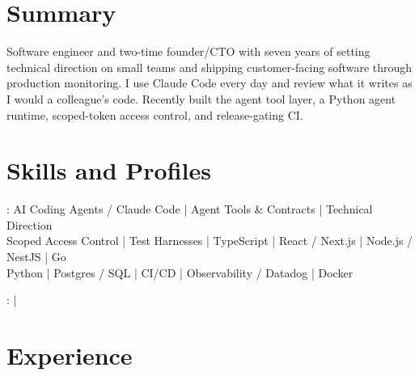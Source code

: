 \documentclass[print]{jack-resume}
\begin{document}
\pagecolor{darkmodeBackground}


\begin{minipage}[t][1cm][t]{.03\textwidth}
    \hfill
\end{minipage}

\section{Summary}
Software engineer and two-time founder/CTO with seven years of setting technical direction on small teams and shipping customer-facing software through production monitoring. I use Claude Code every day and review what it writes as I would a colleague's code. Recently built the agent tool layer, a Python agent runtime, scoped-token access control, and release-gating CI.
\sectionsep

\section{Skills and Profiles}
:
AI Coding Agents / Claude Code \hfill | \hfill
Agent Tools \& Contracts \hfill | \hfill
Technical Direction \\
\hspace{1.0cm} Scoped Access Control \hfill | \hfill
Test Harnesses \hfill | \hfill
TypeScript \hfill | \hfill
React / Next.js \hfill | \hfill
Node.js / NestJS \hfill | \hfill
Go \\
\hspace{1.0cm} Python \hfill | \hfill
Postgres / SQL \hfill | \hfill
CI/CD \hfill | \hfill
Observability / Datadog \hfill | \hfill
Docker \\

\raggedright{
    :
      \href{https://www.linkedin.com/in/jack-sturtevant/}{ \ExternalLink} |
     \href{https://github.com/jacksturt}{ \ExternalLink}}

\section{Experience}
\end{document}
